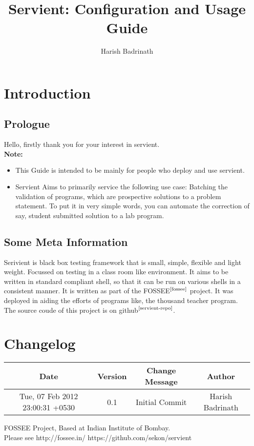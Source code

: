\documentclass{book}
\title{Servient: Configuration and Usage Guide}
\author{Harish Badrinath}
\begin{document}
  \maketitle
  \tableofcontents{}
  \chapter{Introduction}
    \section{Prologue}
      Hello, firstly thank you for your interest in servient. \\
      \textbf{Note:}\\
      \begin{itemize}
        \item This Guide is intended to be mainly for people who deploy and use servient.\\
        \item Servient Aims to primarily service the following use case: Batching the validation of programs, which are prospective solutions to a problem statement. To put it in very simple words, you can automate the correction of say, student submitted solution to a lab program.
      \end{itemize}
    \section{Some Meta Information}
        Serivient is black box testing framework that is small, simple, flexible and light weight. Focussed on testing in a class room like environment.
        It aims to be written in standard compliant shell, so that it can be run on various shells in a consistent manner.
        It is written as part of the FOSSEE$^{\textrm{\cite{fossee}}}$ project. It was deployed in aiding the efforts of programs like, the thousand teacher program.
        The source coude of this project is on github$^{\textrm{\cite{servient-repo}}}$.

  \chapter{Changelog}
    \begin{tabular}{ | c | c | c | c | }
      \hline
      Date & Version & Change Message & Author\\ \hline
      Tue, 07 Feb 2012 23:00:31 +0530 & 0.1 & Initial Commit & Harish Badrinath\\ \hline
    \end{tabular}
  \begin{thebibliography}{99}
    FOSSEE Project, Based at Indian Institute of Bombay.\\
    Please see http://fossee.in/
    https://github.com/sekon/servient
  \end{thebibliography}
\end{document}
